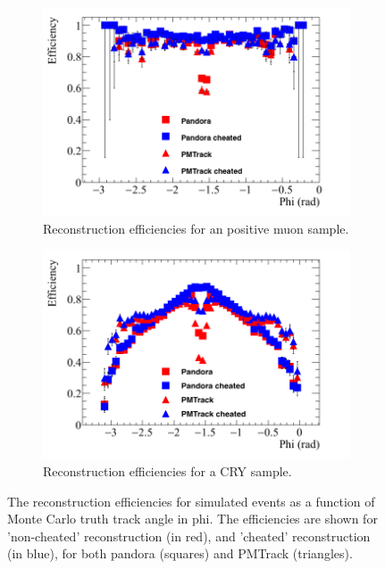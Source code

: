 \begin{figure}[h!]
  \centering
  \begin{subfigure}{0.48\textwidth}
    \centering
    \includegraphics[width=\textwidth]{Effic_AntiMuon_500V_All_Phi}
    \caption{Reconstruction efficiencies for an positive muon sample.}
    \label{fig:SimEffic_Phi_AMu}
  \end{subfigure}%
  \hspace{0.03\textwidth}%
  \begin{subfigure}{0.48\textwidth}
    \centering
    \includegraphics[width=\textwidth]{Effic_Cosmics_500V_All_Phi}
    \caption{Reconstruction efficiencies for a CRY sample.}
    \label{fig:SimEffic_Phi_CRY}
  \end{subfigure}
  \caption[The reconstruction efficiencies for simulated events as a function of Monte Carlo truth track angle in phi.]
          {The reconstruction efficiencies for simulated events as a function of Monte Carlo truth track angle in phi. The efficiencies are shown for 'non-cheated' reconstruction (in red), and 'cheated' reconstruction (in blue), for both pandora (squares) and PMTrack (triangles).}
          \label{fig:SimEffic_Phi}
\end{figure}

